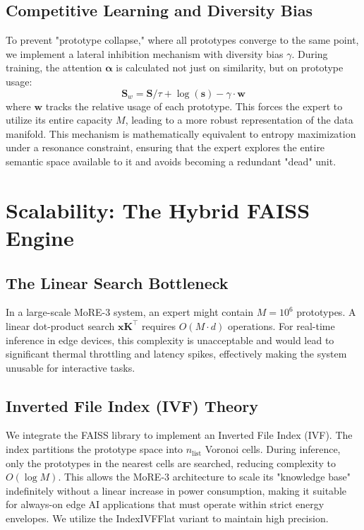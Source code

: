 \documentclass[11pt,hidelinks]{article}
\begin{document}
\subsection{Competitive Learning and Diversity Bias}
To prevent "prototype collapse," where all prototypes converge to the same point, we implement a lateral inhibition mechanism with diversity bias $\gamma$. During training, the attention $\boldsymbol{\alpha}$ is calculated not just on similarity, but on prototype usage:
\begin{equation}
\mathbf{S}_w = \mathbf{S} / \tau + \log(\mathbf{s}) - \gamma \cdot \mathbf{w}
\end{equation}
where $\mathbf{w}$ tracks the relative usage of each prototype. This forces the expert to utilize its entire capacity $M$, leading to a more robust representation of the data manifold. This mechanism is mathematically equivalent to entropy maximization under a resonance constraint, ensuring that the expert explores the entire semantic space available to it and avoids becoming a redundant "dead" unit.

\section{Scalability: The Hybrid FAISS Engine}
\subsection{The Linear Search Bottleneck}
In a large-scale MoRE-3 system, an expert might contain $M = 10^6$ prototypes. A linear dot-product search $\mathbf{x} \mathbf{K}^\top$ requires $O(M \cdot d)$ operations. For real-time inference in edge devices, this complexity is unacceptable and would lead to significant thermal throttling and latency spikes, effectively making the system unusable for interactive tasks.

\subsection{Inverted File Index (IVF) Theory}
We integrate the FAISS library \citep{beyer1999nearest} to implement an Inverted File Index (IVF). The index partitions the prototype space into $n_{\text{list}}$ Voronoi cells. During inference, only the prototypes in the nearest cells are searched, reducing complexity to $O(\log M)$. This allows the MoRE-3 architecture to scale its "knowledge base" indefinitely without a linear increase in power consumption, making it suitable for always-on edge AI applications that must operate within strict energy envelopes. We utilize the IndexIVFFlat variant to maintain high precision.
\end{document}
